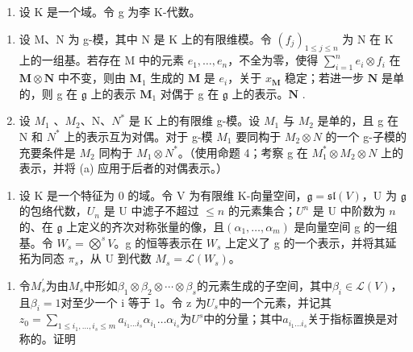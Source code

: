 \begin{enumerate}
\def\labelenumi{\arabic{enumi}.}
\setcounter{enumi}{3}
\tightlist
\item
  设 K 是一个域。令 g 为李 K-代数。
\end{enumerate}

\begin{enumerate}
\def\labelenumi{(\alph{enumi})}
\item
  设 M、N 为 g-模，其中 N 是 K 上的有限维模。令 \((f_{j})_{1 \leqslant j \leqslant n}\) 为 N 在 K 上的一组基。若存在 M 中的元素 \(e_{1}, \ldots, e_{n}\)，不全为零，使得 \(\sum_{i=1}^{n} e_i \otimes f_i\) 在 \(\mathbf{M} \otimes \mathbf{N}\)  中不变，则由 \(\mathbf{M}_1\) 生成的 \(\mathbf{M}\) 是 \(e_i\)，关于 \(x_{\mathbf{M}}\) 稳定；若进一步 \(\mathbf{N}\) 是单的，则 g 在 \(\mathfrak{g}\) 上的表示 \(\mathbf{M}_1\) 对偶于 g 在 \(\mathfrak{g}\) 上的表示。\(\mathbf{N}\) .
\item
  设 \(M_{1}\) 、\(M_{2}\)、N、\(N^{*}\) 是 K 上的有限维 g-模。设 \(M_{1}\) 与 \(M_{2}\) 是单的，且 g 在 N 和 \(N^{*}\) 上的表示互为对偶。对于 g-模 \(M_{1}\) 要同构于 \(M_{2} \otimes N\)  的一个 g-子模的充要条件是 \(M_{2}\) 同构于 \(M_{1} \otimes N^{*}\)。（使用命题 4；考察 g 在 \(M_{1}^{*} \otimes M_{2} \otimes N\) 上的表示，并将 (a) 应用于后者的对偶表示。）
\end{enumerate}

\begin{enumerate}
\def\labelenumi{\arabic{enumi}.}
\setcounter{enumi}{4}
\tightlist
\item
  设 K 是一个特征为 0 的域。令 V 为有限维 K-向量空间，\(\mathfrak{g} = \mathfrak{sl}(V)\)，U 为 \(\mathfrak{g}\) 的包络代数，\(U_n\) 是 U 中滤子不超过 \(\leqslant n\) 的元素集合；\(U^n\) 是 U 中阶数为 \(n\) 的、在 \(\mathfrak{g}\) 上定义的齐次对称张量的像，且\((\alpha_1, \ldots, \alpha_m)\) 是向量空间 g 的一组基。令 \(W_{s} = \bigotimes^{s} V\)。g 的恒等表示在 \(W_{s}\) 上定义了 g 的一个表示，并将其延拓为同态 \(\pi_s\)，从 U 到代数 \(M_s = \mathcal{L}(W_s)\)。
\end{enumerate}

\begin{enumerate}
\def\labelenumi{(\alph{enumi})}
\tightlist
\item
  令\(M_{s}^{\prime}\)为由\(M_{s}\)中形如\(\beta_{1} \otimes \beta_{2} \otimes \cdots \otimes \beta_{s}\)的元素生成的子空间，其中\(\beta_{i} \in \mathcal{L}(V)\)，且\(\beta_{i} = 1\)对至少一个 i 等于 1。令 z 为\(U_{s}\)中的一个元素，并记其\(z_{0} = \sum_{1 \leqslant i_{1}, \ldots, i_{s} \leqslant m} a_{i_{1} \ldots i_{s}} \alpha_{i_{1}} \ldots \alpha_{i_{s}}\)为\(U^{s}\)中的分量；其中\(a_{i_{1} \ldots i_{s}}\)关于指标置换是对称的。证明
\end{enumerate}

